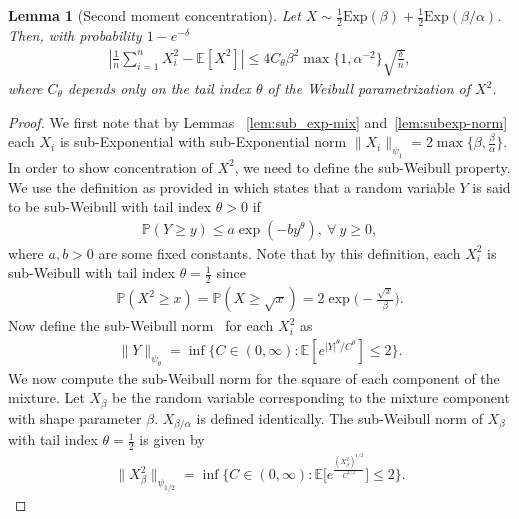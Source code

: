 \documentclass[runningheads]{llncs}
\newcommand{\E}{\mathbb{E}}
\newtheorem{lem}[theorem]{Lemma}
\begin{document}
\begin{subappendices}
\begin{lem}[Second moment concentration]
  \label{lem:moment_concentration}
  Let $X \sim \frac{1}{2}\text{Exp}(\beta)+\frac{1}{2}\text{Exp}(\beta/\alpha)$.
  Then, with probability $1- e^{-\delta}$
  \begin{align*}
    \left| \frac{1}{n} \sum_{i=1}^n X_i^2 - \E[X^2]\right|
    \leq
    4 C_\theta \beta^{2}\max\{1, \alpha^{-2}\} \sqrt{\frac{\delta}{n}},
  \end{align*}
  where $C_{\theta}$ depends only on the tail index $\theta$ of the Weibull
  parametrization of $X^2$.
\end{lem}
\begin{proof}
  We first note that by Lemmas ~\ref{lem:sub_exp-mix} and~\ref{lem:subexp-norm}
  each $X_i$ is sub-Exponential with sub-Exponential norm $\|X_i\|_{\psi_1} =
  2\max\{\beta, \frac{\beta}{\alpha}\}$.
  In order to show concentration of $X^2$, we need to define the sub-Weibull property.
  We use the definition as provided in \cite[Corollary
  6.1]{zhang2020concentration} which states that a random variable $Y$ is said
  to be sub-Weibull with tail index $\theta>0$ if
  \begin{align*}
    \mathbb{P}(Y\geq y) \leq a \exp(-by^{\theta}), \ \forall\ y\geq 0,
  \end{align*}
  where $a, b>0$ are some fixed constants.
  Note that by this definition, each $X^2_i$ is sub-Weibull with tail
  index $\theta = \frac{1}{2}$ since
  \begin{align*}
    \mathbb{P}(X^2 \geq x)
    = \mathbb{P}(X \geq \sqrt{x})
    = 2\exp\Big(-\frac{\sqrt{x}}{\beta}\Big).
  \end{align*}
  Now define the sub-Weibull norm~\cite[Definition
  6.2]{zhang2020concentration} for each $X_i^2$ as
  \begin{align*}
    \|Y\|_{\psi_\theta} = \inf \{C \in (0, \infty): \E[e^{|Y|^\theta/C^{\theta}}]\leq 2\}.
  \end{align*}
  We now compute the sub-Weibull norm for the square of each component of
  the mixture. Let $X_{\beta}$ be the random variable corresponding to the
  mixture component with shape parameter $\beta$. $X_{\beta/\alpha}$ is
  defined identically. The sub-Weibull norm of $X_{\beta}$ with tail index
  $\theta=\frac{1}{2}$ is given by
  \begin{align*}
    \|X_{\beta}^2\|_{\psi_{1/2}}
    =
    \inf \Big\{C \in (0, \infty):
    \E\Big[e^{\frac{(X_{\beta}^2)^{1/2}}{C^{1/2}}}\Big] \leq 2
    \Big\}.
  \end{align*}

\end{proof}
\end{subappendices}
\end{document}
